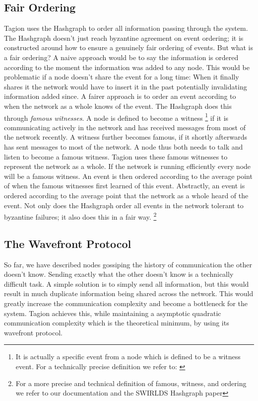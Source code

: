 \subsection{Fair Ordering}
    Tagion uses the Hashgraph to order all information passing through the system. The Hashgraph doesn't just reach byzantine agreement on event ordering; it is constructed around how to ensure a genuinely fair ordering of events. But what is a fair ordering? A naive approach would be to say the information is ordered according to the moment the information was added to any node. This would be problematic if a node doesn't share the event for a long time: When it finally shares it the network would have to insert it in the past potentially invalidating information added since. A fairer approach is to order an event according to when the network as a whole knows of the event. The Hashgraph does this through \textit{famous witnesses}. A node is defined to become a witness
        \footnote{It is actually a specific event from a node which is defined to be a witness event. For a technically precise definition we refer to: \cite{SWIRLDS_HASHGRAPH}}
    if it is communicating actively in the network and has received messages from most of the network recently. A witness further becomes famous, if it shortly afterwards has sent messages to most of the network. A node thus both needs to talk and listen to become a famous witness. Tagion uses these famous witnesses to represent the network as a whole. If the network is running efficiently every node will be a famous witness. An event is then ordered according to the average point of when the famous witnesses first learned of this event. Abstractly, an event is ordered according to the average point that the network as a whole heard of the event. Not only does the Hashgraph order all events in the network tolerant to byzantine failures; it also does this in a fair way.
    \footnote{For a more precise and technical definition of famous, witness, and ordering we refer to our documentation and the SWIRLDS Hashgraph paper}

\subsection{The Wavefront Protocol}
    So far, we have described nodes gossiping the history of communication the other doesn't know. Sending exactly what the other doesn't know is a technically difficult task. A simple solution is to simply send all information, but this would result in much duplicate information being shared across the network. This would greatly increase the communication complexity and become a bottleneck for the system. Tagion achieves this, while maintaining a asymptotic quadratic communication complexity which is the theoretical minimum, by using its \gls{wavefront protocol}.
    
